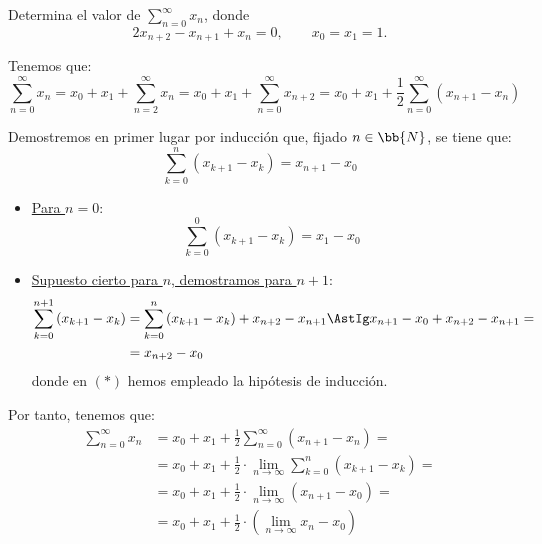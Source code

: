 \begin{ejercicio}
    Determina el valor de $\sum\limits_{n=0}^{\infty} x_n$, donde
    \begin{equation*}
        2x_{n+2} - x_{n+1} + x_n = 0, \qquad x_0 = x_1 = 1.
    \end{equation*}

    Tenemos que:
    \begin{equation*}
        \sum\limits_{n=0}^{\infty} x_n = x_0+x_1 + \sum\limits_{n=2}^{\infty}x_n
        = x_0+x_1 + \sum\limits_{n=0}^{\infty}x_{n+2}
        = x_0+x_1 + \frac{1}{2}\sum\limits_{n=0}^{\infty}\left(x_{n+1} - x_n\right)
    \end{equation*}

    Demostremos en primer lugar por inducción que, fijado $n\in \bb{N}$, se tiene que:
    \begin{equation*}
        \sum_{k=0}^n \left(x_{k+1} - x_k\right) = x_{n+1} - x_0
    \end{equation*}
    \begin{itemize}
        \item \ul{Para $n=0$}:
        \begin{equation*}
            \sum_{k=0}^0 \left(x_{k+1} - x_k\right) = x_1 - x_0
        \end{equation*}

        \item \ul{Supuesto cierto para $n$, demostramos para $n+1$}:
        \begin{align*}
            \sum_{k=0}^{n+1} \left(x_{k+1} - x_k\right) &= 
            \sum_{k=0}^{n} \left(x_{k+1} - x_k\right) + x_{n+2} - x_{n+1}
            \AstIg x_{n+1} - x_0+ x_{n+2} - x_{n+1} =\\&= x_{n+2} - x_0
        \end{align*}
        donde en $(\ast)$ hemos empleado la hipótesis de inducción.
    \end{itemize}

    Por tanto, tenemos que:
    \begin{align*}
        \sum\limits_{n=0}^{\infty} x_n
        &= x_0+x_1 + \frac{1}{2}\sum\limits_{n=0}^{\infty}\left(x_{n+1} - x_n\right) =\\
        &=  x_0+x_1 + \frac{1}{2} \cdot \lim_{n\to \infty}\sum_{k=0}^n \left(x_{k+1} - x_k\right) =\\
        &=  x_0+x_1 + \frac{1}{2} \cdot \lim_{n\to \infty}\left(x_{n+1} - x_0\right) =\\
        &=  x_0+x_1 + \frac{1}{2} \cdot \left(\lim_{n\to \infty}x_{n} - x_0\right)
    \end{align*}


\end{ejercicio}
